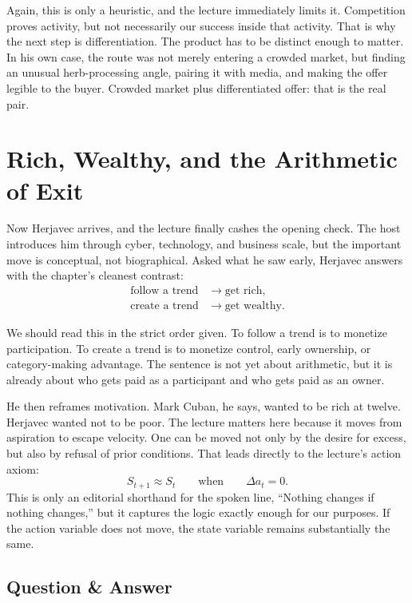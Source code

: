 Again, this is only a heuristic, and the lecture immediately limits it. Competition proves activity, but not necessarily our success inside that activity. That is why the next step is differentiation. The product has to be distinct enough to matter. In his own case, the route was not merely entering a crowded market, but finding an unusual herb-processing angle, pairing it with media, and making the offer legible to the buyer. Crowded market plus differentiated offer: that is the real pair.

\section{Rich, Wealthy, and the Arithmetic of Exit}

Now Herjavec arrives, and the lecture finally cashes the opening check. The host introduces him through cyber, technology, and business scale, but the important move is conceptual, not biographical. Asked what he saw early, Herjavec answers with the chapter's cleanest contrast:
\begin{align}
\text{follow a trend} &\to \text{get rich},\\
\text{create a trend} &\to \text{get wealthy}.
\end{align}

We should read this in the strict order given. To follow a trend is to monetize participation. To create a trend is to monetize control, early ownership, or category-making advantage. The sentence is not yet about arithmetic, but it is already about who gets paid as a participant and who gets paid as an owner.

He then reframes motivation. Mark Cuban, he says, wanted to be rich at twelve. Herjavec wanted not to be poor. The lecture matters here because it moves from aspiration to escape velocity. One can be moved not only by the desire for excess, but also by refusal of prior conditions. That leads directly to the lecture's action axiom:
\begin{equation}
S_{t+1} \approx S_t
\qquad
\text{when}
\qquad
\Delta a_t = 0.
\end{equation}
This is only an editorial shorthand for the spoken line, ``Nothing changes if nothing changes,'' but it captures the logic exactly enough for our purposes. If the action variable does not move, the state variable remains substantially the same.

\subsection{Question \& Answer}

